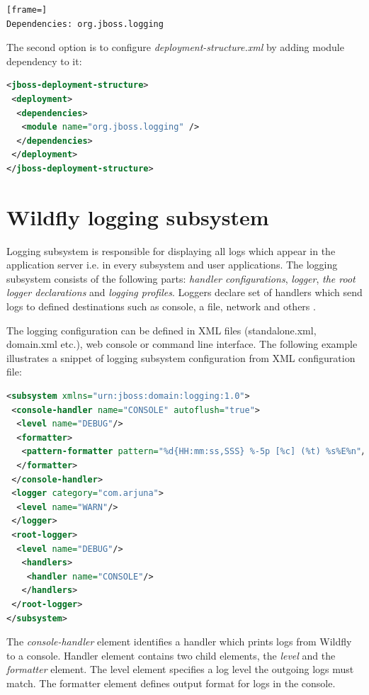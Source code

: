 \documentclass[12pt,oneside]{fithesis2}
\begin{document}
\begin{lstlisting}[frame=]
Dependencies: org.jboss.logging
\end{lstlisting}

\newpage
The second option is to configure \textit{deployment-structure.xml} by adding module dependency to it:

\begin{lstlisting}[caption = Configuring deployment structure file \cite{wildfly_book}, label = dynamic_module_descriptor, language=XML]
<jboss-deployment-structure>
 <deployment>
  <dependencies>
   <module name="org.jboss.logging" />
  </dependencies>
 </deployment>
</jboss-deployment-structure>
\end{lstlisting}

\section{Wildfly logging subsystem}
\label{wildfly_logging}
Logging subsystem is responsible for displaying all logs which appear in the application server i.e. in every subsystem and user applications. The logging subsystem consists of the following parts: \textit{handler configurations}, \textit{logger}, \textit{the root logger declarations} and \textit{logging profiles}. Loggers declare set of handlers which send logs to defined destinations such as console, a file, network and others \cite[Logging Configuration]{wildfly_doc}.

The logging configuration can be defined in XML files (standalone.xml, domain.xml etc.), web console or command line interface. The following example illustrates a snippet of logging subsystem configuration from XML configuration file:

\begin{lstlisting}[caption = Configuring logging subsystem, label = logging_subsystem, language=XML]
<subsystem xmlns="urn:jboss:domain:logging:1.0">
 <console-handler name="CONSOLE" autoflush="true">
  <level name="DEBUG"/>
  <formatter>
   <pattern-formatter pattern="%d{HH:mm:ss,SSS} %-5p [%c] (%t) %s%E%n"/>
  </formatter>
 </console-handler>
 <logger category="com.arjuna">
  <level name="WARN"/>
 </logger>
 <root-logger>
  <level name="DEBUG"/>
   <handlers>
    <handler name="CONSOLE"/>
   </handlers>
 </root-logger>
</subsystem>
\end{lstlisting}
\noindent
The \textit{console-handler} element identifies a handler which prints logs from Wildfly to a console. Handler element contains two child elements, the \textit{level} and the \textit{formatter} element. The level element specifies a log level the outgoing logs must match. The formatter element defines output format for logs in the console.
\end{document}
